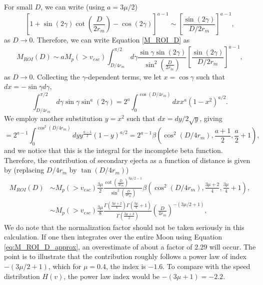 \documentclass{hitec}
\numberwithin{equation}{section}
\begin{document}
For small $D$, we can write (using $a = 3\mu/2$)
\begin{equation}
\left[1+\sin(2\gamma)\cot\left(\frac{D}{2r_m}\right)-\cos(2\gamma)\right]^{a-1} \sim
\left[\frac{\sin(2\gamma)}{D/2r_m}\right]^{a-1},
\end{equation}
as $D\to 0$. Therefore, we can write Equation \eqref{M_ROI_D} as
\begin{equation}
M_{ROI}(D) \sim a M_p(>v_{esc})\int_{D/4r_m}^{\pi/2}d\gamma\frac{\sin\gamma\sin(2\gamma)}{\sin^2\left(\frac{D}{2r_m}\right)}
\left[\frac{\sin(2\gamma)}{D/2r_m}\right]^{a-1},
\end{equation}
as $D\to 0$. Collecting the $\gamma$-dependent terms, we let $x=\cos\gamma$ such that $dx = -\sin\gamma d\gamma$,
\begin{equation}
\int_{D/4r_m}^{\pi/2}d\gamma\sin\gamma\sin^a(2\gamma) = 2^a\int_{0}^{\cos(D/4r_m)}dx x^a(1-x^2)^{a/2}.
\end{equation}
We employ another substitution $y=x^2$ such that $dx = dy/2\sqrt{y}$, giving
\begin{equation}
= 2^{a-1}\int_{0}^{\cos^2(D/4r_m)}dy y^{\frac{a-1}{2}}(1-y)^{a/2} = 2^{a-1}\beta\left(\cos^2(D/4r_m),\frac{a+1}{2}, \frac{a}{2}+1\right),
\end{equation}
and we notice that this is the integral for the incomplete beta function. Therefore, the contribution of secondary ejecta as a function of distance is given by (replacing $D/4r_m$ by $\tan(D/4r_m)$)
\begin{align}
M_{ROI}(D) &\sim M_p(>v_{esc})\frac{3\mu}{2} \frac{\cot\left(\frac{D}{4r_m}\right)^{3\mu/2-1}}{\sin^2\left(\frac{D}{2r_m}\right)}
\beta\left(\cos^2(D/4r_m),\frac{3\mu+2}{4}, \frac{3\mu}{4}+1\right),\\\label{eq:M_ROI_D_approx}
&\sim M_p(>v_{esc})\frac{3\mu}{8}\frac{\Gamma\left(\frac{3\mu+2}{4}\right)\Gamma\left(\frac{3\mu}{4}+1\right)}{\Gamma\left(\frac{3\mu+3}{2}\right)}
\left(\frac{D}{4r_m}\right)^{-(3\mu/2+1)},
\end{align}
We do note that the normalization factor should not be taken seriously in this calculation. If one then integrates over the entire Moon using Equation \eqref{eq:M_ROI_D_approx}, an overestimate of about a factor of $2.29$ will occur. The point is to illustrate that the contribution roughly follows a power law of index $-(3\mu/2+1)$, which for $\mu=0.4$, the index is $-1.6$. To compare with the speed distribution $H(v)$, the power law index would be $-(3\mu+1) = -2.2$.
\end{document}
